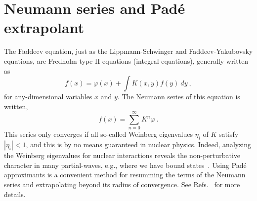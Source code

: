 \documentclass[aps,prc,showpacs,twocolumn,floatfix,nobibnotes,nofootinbib,amsmath,amssymb,longbibliography]{revtex4-2}
\begin{document}
\section{Neumann series and Pad\'e extrapolant}
\label{app | pade}
The Faddeev equation, just as the Lippmann-Schwinger and
Faddeev-Yakubovsky equations, are Fredholm type II equations (integral
equations), generally written as
\begin{equation}
	f(x) = \varphi(x) + \int K(x,y)f(y)\:dy\:,
\end{equation}
for any-dimensional variables $x$ and $y$. The Neumann series of this equation is written,
\begin{equation}
	f(x) = \sum_{n=0}^\infty K^n\varphi \:.
\end{equation}
This series only converges if all so-called Weinberg eigenvalues
$\eta_i$ of $K$ satisfy $|\eta_i|<1$, and this is by no means
guaranteed in nuclear physics. Indeed, analyzing the Weinberg
eigenvalues for nuclear interactions reveals the non-perturbative
character in many partial-waves, e.g., where we have bound
states~\cite{Hoppe:2017lok}. Using Pad\'e approximants is a convenient
method for resumming the terms of the Neumann series and extrapolating
beyond its radius of convergence. See
Refs.~\cite{baker,kukulin2013theory} for more details.
\end{document}
